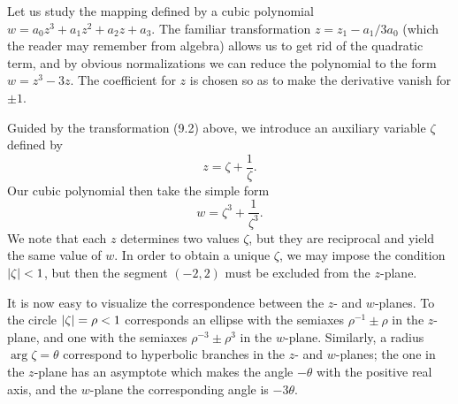 \begin{example}
    Let us study the mapping defined by a cubic polynomial $w=a_0z^3+a_1z^2+a_2z+a_3$. The familiar transformation $z=z_1-a_1/3a_0$ (which the reader may remember from algebra) allows us to get rid of the quadratic term, and by obvious normalizations we can reduce the polynomial to the form $w=z^3-3z$. The coefficient for $z$ is chosen so as to make the derivative vanish for $\pm 1$.

    Guided by the transformation (9.2) above, we introduce an auxiliary variable $\zeta$ defined by $$z=\zeta+\dfrac{1}{\zeta}.$$ Our cubic polynomial then take the simple form $$w=\zeta^3+\dfrac{1}{\zeta^3}.$$ We note that each $z$ determines two values $\zeta$, but they are reciprocal and yield the same value of $w$. In order to obtain a unique $\zeta$, we may impose the condition $\lvert \zeta \rvert<1$, but then the segment $(-2,2)$ must be excluded from the $z$-plane.

    It is now easy to visualize the correspondence between the $z$- and $w$-planes. To the circle $\lvert \zeta \rvert=\rho<1$ corresponds an ellipse with the semiaxes $\rho^{-1} \pm \rho$ in the $z$-plane, and one with the semiaxes $\rho^{-3} \pm \rho^3$ in the $w$-plane. Similarly, a radius $\arg \zeta=\theta$ correspond to hyperbolic branches in the $z$- and $w$-planes; the one in the $z$-plane has an asymptote which makes the angle $-\theta$ with the positive real axis, and the $w$-plane the corresponding angle is $-3\theta$.
\end{example}

